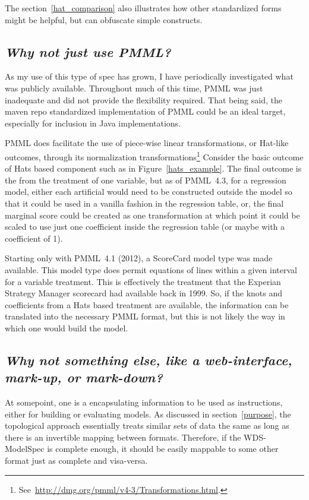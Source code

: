 \documentclass[10pt]{article}
\begin{document}
The section~\ref{hat_comparison} also illustrates how other standardized forms might be helpful, but can obfuscate simple constructs.


\subsection{\em Why not just use PMML?\label{WhyNotPMML}}
As my use of this type of spec has grown, I have periodically investigated what was publicly available.  
Throughout much of this time, PMML was just inadequate and did not provide the flexibility required.  
That being said, the maven repo standardized implementation of PMML could be an ideal target, especially 
for inclusion in Java implementations.   

PMML does facilitate the use of piece-wise linear transformations, or Hat-like outcomes, through its normalization
transformations\footnote{See~\url{http://dmg.org/pmml/v4-3/Transformations.html}.}  Consider the
basic outcome of Hats based component such as in Figure~\ref{hats_example}.  The final outcome is 
the from the treatment of one variable, but as of PMML~4.3, for a regression model, either
each artificial would need to be constructed outside the model so that it could be used in a 
vanilla fashion in the regression table, or, the final marginal score could be created as one transformation
at which point it could be scaled to use just one coefficient inside the regression table (or maybe with a coefficient of 1).

Starting only with PMML~4.1 (2012), a ScoreCard model type was made available.  This model type does permit 
equations of lines within a given interval for a variable treatment.  This is effectively the treatment that
the Experian Strategy Manager scorecard had available back in 1999.  So, if the knots and coefficients 
from a Hats based treatment are available, the information can be translated into the necessary PMML format,
but this is not likely the way in which one would build the model.

\subsection{\em Why not something else, like a web-interface, mark-up, or mark-down?\label{WhyNotHTML}}
At somepoint, one is a encapsulating information to be used as instructions, either for building or evaluating models.
As discussed in section~\ref{purpose}, the  topological approach essentially treats 
similar sets of data the same as long as there is an invertible mapping between formats.  Therefore,
if the WDS-ModelSpec is complete enough, it should be easily mappable to some other format just as complete and visa-versa.
\end{document}
